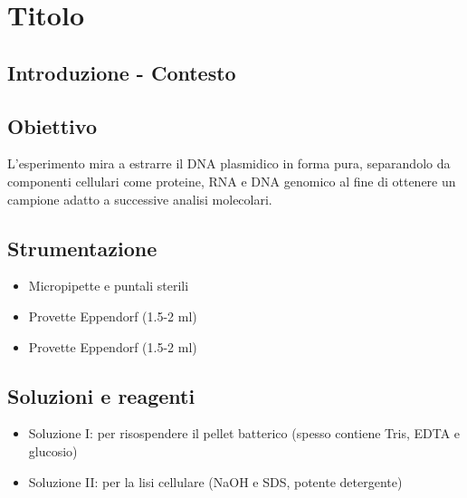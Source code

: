 \section {Titolo}

\subsection{Introduzione - Contesto}


\subsection{Obiettivo}
L’esperimento mira a estrarre il DNA plasmidico in forma pura, separandolo da componenti cellulari come proteine, RNA e DNA genomico al fine di ottenere un campione adatto a successive analisi molecolari.

\subsection{Strumentazione}
\begin{itemize}
	\item Micropipette e puntali sterili
	\item Provette Eppendorf (1.5-2 ml)
	\item Provette Eppendorf (1.5-2 ml)
\end{itemize}

\subsection{Soluzioni e reagenti}
\begin{itemize}
	\item {Soluzione I}: per risospendere il pellet batterico (spesso contiene Tris, EDTA e glucosio)
	\item {Soluzione II}: per la lisi cellulare (NaOH e SDS, potente detergente)
\end{itemize}

